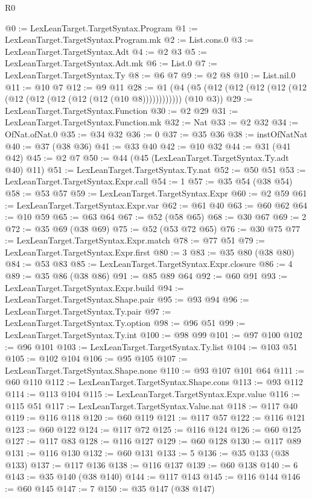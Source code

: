 \begin{lexlean}{R0}
\begin{coremodule}
@0 := LexLeanTarget.TargetSyntax.Program
@1 := LexLeanTarget.TargetSyntax.Program.mk
@2 := List.cons.{0}
@3 := LexLeanTarget.TargetSyntax.Adt
@4 := @2 @3
@5 := LexLeanTarget.TargetSyntax.Adt.mk
@6 := List.{0}
@7 := LexLeanTarget.TargetSyntax.Ty
@8 := @6 @7
@9 := @2 @8
@10 := List.nil.{0}
@11 := @10 @7
@12 := @9 @11
@28 := @1 (@4 (@5 (@12 (@12 (@12 (@12 (@12 (@12 (@12 (@12 (@12 (@12 (@10 @8)))))))))))) (@10 @3))
@29 := LexLeanTarget.TargetSyntax.Function
@30 := @2 @29
@31 := LexLeanTarget.TargetSyntax.Function.mk
@32 := Nat
@33 := @2 @32
@34 := OfNat.ofNat.{0}
@35 := @34 @32
@36 := 0
@37 := @35 @36
@38 := instOfNatNat
@40 := @37 (@38 @36)
@41 := @33 @40
@42 := @10 @32
@44 := @31 (@41 @42)
@45 := @2 @7
@50 := @44 (@45 (LexLeanTarget.TargetSyntax.Ty.adt @40) @11)
@51 := LexLeanTarget.TargetSyntax.Ty.nat
@52 := @50 @51
@53 := LexLeanTarget.TargetSyntax.Expr.call
@54 := 1
@57 := @35 @54 (@38 @54)
@58 := @53 @57
@59 := LexLeanTarget.TargetSyntax.Expr
@60 := @2 @59
@61 := LexLeanTarget.TargetSyntax.Expr.var
@62 := @61 @40
@63 := @60 @62
@64 := @10 @59
@65 := @63 @64
@67 := @52 (@58 @65)
@68 := @30 @67
@69 := 2
@72 := @35 @69 (@38 @69)
@75 := @52 (@53 @72 @65)
@76 := @30 @75
@77 := LexLeanTarget.TargetSyntax.Expr.match
@78 := @77 @51
@79 := LexLeanTarget.TargetSyntax.Expr.first
@80 := 3
@83 := @35 @80 (@38 @80)
@84 := @53 @83
@85 := LexLeanTarget.TargetSyntax.Expr.closure
@86 := 4
@89 := @35 @86 (@38 @86)
@91 := @85 @89 @64
@92 := @60 @91
@93 := LexLeanTarget.TargetSyntax.Expr.build
@94 := LexLeanTarget.TargetSyntax.Shape.pair
@95 := @93 @94
@96 := LexLeanTarget.TargetSyntax.Ty.pair
@97 := LexLeanTarget.TargetSyntax.Ty.option
@98 := @96 @51
@99 := LexLeanTarget.TargetSyntax.Ty.int
@100 := @98 @99
@101 := @97 @100
@102 := @96 @101
@103 := LexLeanTarget.TargetSyntax.Ty.list
@104 := @103 @51
@105 := @102 @104
@106 := @95 @105
@107 := LexLeanTarget.TargetSyntax.Shape.none
@110 := @93 @107 @101 @64
@111 := @60 @110
@112 := LexLeanTarget.TargetSyntax.Shape.cons
@113 := @93 @112
@114 := @113 @104
@115 := LexLeanTarget.TargetSyntax.Expr.value
@116 := @115 @51
@117 := LexLeanTarget.TargetSyntax.Value.nat
@118 := @117 @40
@119 := @116 @118
@120 := @60 @119
@121 := @117 @57
@122 := @116 @121
@123 := @60 @122
@124 := @117 @72
@125 := @116 @124
@126 := @60 @125
@127 := @117 @83
@128 := @116 @127
@129 := @60 @128
@130 := @117 @89
@131 := @116 @130
@132 := @60 @131
@133 := 5
@136 := @35 @133 (@38 @133)
@137 := @117 @136
@138 := @116 @137
@139 := @60 @138
@140 := 6
@143 := @35 @140 (@38 @140)
@144 := @117 @143
@145 := @116 @144
@146 := @60 @145
@147 := 7
@150 := @35 @147 (@38 @147)

\end{coremodule}
\end{lexlean}
